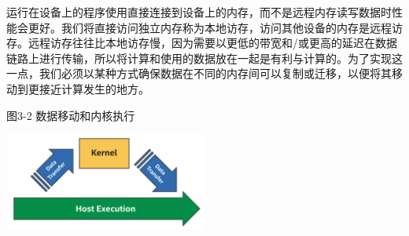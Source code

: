 运行在设备上的程序使用直接连接到设备上的内存，而不是远程内存读写数据时性能会更好。我们将直接访问独立内存称为本地访存，访问其他设备的内存是远程访存。远程访存往往比本地访存慢，因为需要以更低的带宽和/或更高的延迟在数据链路上进行传输，所以将计算和使用的数据放在一起是有利与计算的。为了实现这一点，我们必须以某种方式确保数据在不同的内存间可以复制或迁移，以便将其移动到更接近计算发生的地方。\par

\hspace*{\fill} \par %
图3-2 数据移动和内核执行
\begin{center}
	\includegraphics[width=0.5\textwidth]{content/chapter-3/images/3}
\end{center}